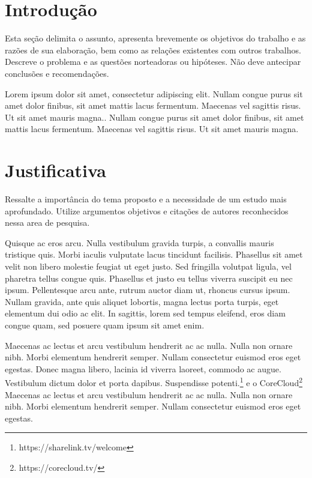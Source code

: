 \documentclass[
	12pt,				%
	openright,			%
	oneside,			%
	a4paper,			%
	chapter=TITLE,		%
	english,			%
	brazil,				%
	]{abntex2}
\renewcommand{\ABNTEXchapterfont}{\normalfont}
\begin{document}
\chapter{Introdução}
\ABNTEXchapterfont
Esta seção delimita o assunto, apresenta brevemente os objetivos do trabalho e as razões de sua elaboração, bem como as relações existentes com outros trabalhos. Descreve o problema e as questões norteadoras ou hipóteses. Não deve antecipar conclusões e recomendações.

Lorem ipsum dolor sit amet, consectetur adipiscing elit. Nullam congue purus sit amet dolor finibus, sit amet mattis lacus fermentum. Maecenas vel sagittis risus. Ut sit amet mauris magna.\cite{wu2001streaming}. Nullam congue purus sit amet dolor finibus, sit amet mattis lacus fermentum. Maecenas vel sagittis risus. Ut sit amet mauris magna.\cite{mao2006mrtp}




\chapter{Justificativa}
Ressalte a importância do tema proposto e a necessidade de um estudo mais aprofundado. Utilize  argumentos objetivos e citações de autores reconhecidos nessa area de pesquisa.

Quisque ac eros arcu. Nulla vestibulum gravida turpis, a convallis mauris tristique quis. Morbi iaculis vulputate lacus tincidunt facilisis. Phasellus sit amet velit non libero molestie feugiat ut eget justo. Sed fringilla volutpat ligula, vel pharetra tellus congue quis. Phasellus et justo eu tellus viverra suscipit eu nec ipsum. Pellentesque arcu ante, rutrum auctor diam ut, rhoncus cursus ipsum. Nullam gravida, ante quis aliquet lobortis, magna lectus porta turpis, eget elementum dui odio ac elit. In sagittis, lorem sed tempus eleifend, eros diam congue quam, sed posuere quam ipsum sit amet enim.\cite{ahsan2011multipath}

Maecenas ac lectus et arcu vestibulum hendrerit ac ac nulla. Nulla non ornare nibh. Morbi elementum hendrerit semper. Nullam consectetur euismod eros eget egestas. Donec magna libero, lacinia id viverra laoreet, commodo ac augue. Vestibulum dictum dolor et porta dapibus. Suspendisse potenti.\footnote{https://sharelink.tv/welcome} e o CoreCloud\footnote{https://corecloud.tv/}  Maecenas ac lectus et arcu vestibulum hendrerit ac ac nulla. Nulla non ornare nibh. Morbi elementum hendrerit semper. Nullam consectetur euismod eros eget egestas.
\end{document}
